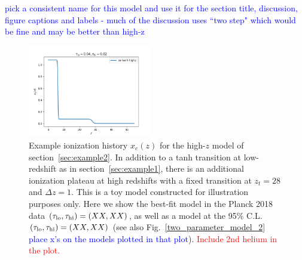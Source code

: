 \documentclass[prd,twocolumn,amsmath,amssymb,floatfix,superscriptaddress,nofootinbib]{revtex4-1}
\newcommand{\refsec}[1]{section~\ref{sec:#1}}
\newcommand{\tauhi}{\tau_{\rm hi}}
\newcommand{\taulo}{\tau_{\rm lo}}
\newcommand{\wh}[1]{\textcolor{blue}{#1}}
\newcommand{\ch}[1]{\textcolor{red}{#1}}
\begin{document}
\wh{pick a consistent name for this model and use it for the section title, discussion, figure captions and labels - much of the discussion uses ``two step" which would be fine and may be better than high-z}

\begin{figure}
\includegraphics[width=0.48\textwidth]{results/cosmomc_kde/taulo_prior_test/plot_xez_taulo_0p04_tauhi_0p02.png}
\caption{Example ionization history $x_e(z)$ for the high-$z$ model of \refsec{example2}. In addition to a tanh transition at low-redshift as in \refsec{example1}, there is an additional ionization plateau at high redshifts with a fixed transition at $z_t = 28$ and $\Delta z = 1$. This is a toy model constructed for illustration purposes only. Here we show the best-fit model in the Planck 2018 data $(\taulo, \tauhi) = (XX, XX)$, as well as  a model at the 95\% C.L. $(\taulo, \tauhi) = (XX, XX)$ (see also Fig.~\ref{two_parameter_model_2}  \wh{place x's on the models plotted in that plot}). \ch{Include 2nd helium in the plot.}
}
\label{fig:two_step_model}
\end{figure}

%
%
\end{document}
